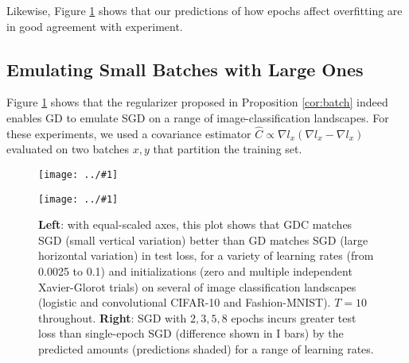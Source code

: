\documentclass{article}
\newcommand{\plotmoo}[3]{
    \texttt{[image: ../\#1]}
}
\newcommand{\lorem}[1]{
    Lorem ipsum dolor sit amet, consectetur adipiscing elit...\\
    \nopagebreak\vspace{#1cm} \ \\
    ...sunt in culpa qui officia deserunt mollit anim id est laborum.
}
\begin{document}
 
        Likewise, Figure \ref{fig:bmmulti} shows that our predictions of how 
        epochs affect overfitting are in good agreement with experiment. 
    

    \subsection{Emulating Small Batches with Large Ones}
        Figure \ref{fig:bmmulti} shows that the regularizer proposed in
        Proposition \ref{cor:batch} indeed enables GD to emulate SGD
        on a range of image-classification landscapes.  For these experiments,
        we used a covariance
        estimator $\hat C \propto \nabla l_x (\nabla l_x - \nabla l_x)$ evaluated on
        two batches $x, y$ that partition the training set.
        \begin{figure}[h!] 
            \centering
            \plotmoo{plots/big-bm-new}{0.48\columnwidth}{4.0cm}
            \plotmoo{plots/multi-fashion-logistic-0}{0.48\columnwidth}{4.0cm}
            \caption{
                {\bf Left}: with equal-scaled axes, this plot shows that GDC
                matches SGD (small vertical variation) better than GD matches
                SGD (large horizontal variation) in test loss, for a variety of
                learning rates (from 0.0025 to 0.1) and initializations (zero
                and multiple independent Xavier-Glorot trials) on several of
                image classification landscapes (logistic and convolutional
                CIFAR-10 and Fashion-MNIST).  $T=10$ throughout.
                {\bf Right}: SGD with $2, 3, 5, 8$ epochs incurs greater test
                loss than single-epoch SGD (difference shown in I bars) by the
                predicted amounts (predictions shaded) for a range of learning
                rates.
            }
            \label{fig:bmmulti}
        \end{figure}
  
\end{document}
